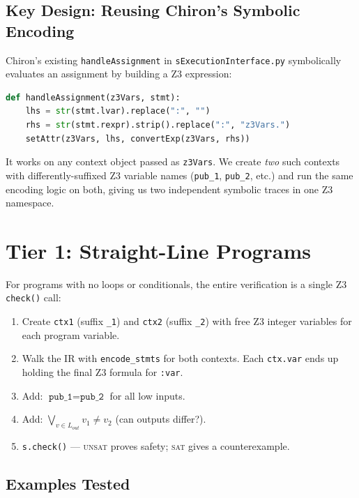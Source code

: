 \documentclass[11pt,a4paper]{article}
\begin{document}
\subsection{Key Design: Reusing Chiron's Symbolic Encoding}

Chiron's existing \texttt{handleAssignment} in \texttt{sExecutionInterface.py}
symbolically evaluates an assignment by building a Z3 expression:

\begin{lstlisting}[style=code, language=Python]
def handleAssignment(z3Vars, stmt):
    lhs = str(stmt.lvar).replace(":", "")
    rhs = str(stmt.rexpr).strip().replace(":", "z3Vars.")
    setAttr(z3Vars, lhs, convertExp(z3Vars, rhs))
\end{lstlisting}

It works on any context object passed as \texttt{z3Vars}. We create \emph{two}
such contexts with differently-suffixed Z3 variable names (\texttt{pub\_1},
\texttt{pub\_2}, etc.) and run the same encoding logic on both, giving us two
independent symbolic traces in one Z3 namespace.

\section{Tier 1: Straight-Line Programs}

For programs with no loops or conditionals, the entire verification is a single
Z3 \texttt{check()} call:

\begin{enumerate}[noitemsep]
  \item Create \texttt{ctx1} (suffix \texttt{\_1}) and \texttt{ctx2} (suffix
        \texttt{\_2}) with free Z3 integer variables for each program variable.
  \item Walk the IR with \texttt{encode\_stmts} for both contexts. Each
        \texttt{ctx.var} ends up holding the final Z3 formula for \texttt{:var}.
  \item Add: $\texttt{pub\_1} = \texttt{pub\_2}$ for all low inputs.
  \item Add: $\bigvee_{v \in L_{out}} v_1 \neq v_2$ (can outputs differ?).
  \item \texttt{s.check()} — \textsc{unsat} proves safety; \textsc{sat} gives a
        counterexample.
\end{enumerate}

\subsection*{Examples Tested}
\end{document}
